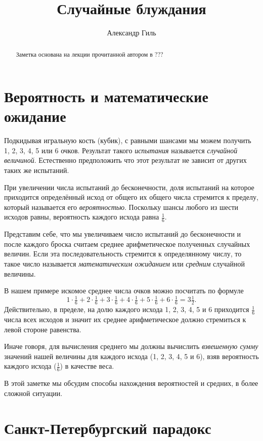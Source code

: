 \documentclass{article}
\begin{document}
\title{Случайные блуждания}
\author{Александр Гиль}
\date{}
\maketitle
\begin{abstract}
Заметка основана на лекции прочитанной автором в ??? 
\end{abstract}

\section{Вероятность и математические ожидание}

Подкидывая игральную кость (кубик),
с равными шансами мы можем получить 1, 2, 3, 4, 5 или 6 очков.
Результат такого \emph{испытания} называется \emph{случайной величиной}.
Естественно предположить что этот результат не зависит от других таких же испытаний.

При увеличении числа испытаний до бесконечности,
доля испытаний на которое приходится определённый исход 
от общего их общего числа 
стремится к пределу, 
который называется его \emph{вероятностью}.
Поскольку шансы любого из шести исходов равны,
вероятность каждого исхода равна $\tfrac16$.

Представим себе, что мы увеличиваем число испытаний до бесконечности
и после каждого броска считаем среднее арифметическое полученных случайных величин.
Если эта последовательность стремится к определянному числу,
то такое число называется \emph{математическим ожиданием} или \emph{средним} случайной величины.

В нашем примере искомое среднее числа очков можно посчитать по формуле
\[1\cdot\tfrac16+2\cdot\tfrac16+3\cdot\tfrac16+4\cdot\tfrac16+5\cdot\tfrac16+6\cdot\tfrac16=3\tfrac12.\]
Действительно, в пределе, 
на долю каждого исхода 1, 2, 3, 4, 5 и 6
приходится $\tfrac16$ числа всех исходов
и значит их среднее арифметическое должно 
стремиться к левой стороне равенства.

Иначе говоря, для вычисления среднего мы должны вычислить \emph{взвешенную сумму} значений нашей величины для каждого исхода
(1, 2, 3, 4, 5 и 6), 
взяв вероятность каждого исхода ($\tfrac16$)
в качестве веса.

В этой заметке мы обсудим способы нахождения 
вероятностей 
и средних, 
в более сложной ситуации.
 
\section{Санкт-Петербургский парадокс}
\end{document}
